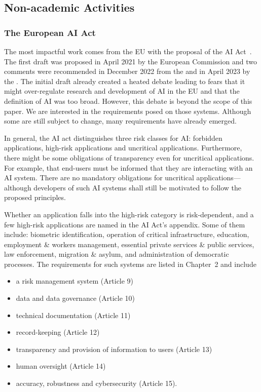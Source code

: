 \subsection{Non-academic Activities}
\subsubsection{The European \ac{AI} Act}
The most impactful work comes from the \ac{EU} with the proposal of the \ac{AI} Act~\citep{AiAct}. The first draft was proposed in April 2021 by the European Commission and two comments were recommended in December 2022 from the \cite{AiAct_Ratskompromiss} and in April 2023 by the \cite{AiAct_Parlamentsvorschlag}. 
The initial draft already created a heated debate leading to fears that it might over-regulate research and development of \ac{AI} in the \ac{EU} and that the definition of \ac{AI} was too broad. However, this debate is beyond the scope of this paper. We are interested in the requirements posed on those systems. Although some are still subject to change, many requirements have already emerged. 

In general, the \ac{AI} act distinguishes three risk classes for \ac{AI}: forbidden applications, high-risk applications and uncritical applications. Furthermore, there might be some obligations of transparency even for uncritical applications. For example, that end-users must be informed that they are interacting with an \ac{AI} system. There are no mandatory obligations for uncritical applications---although developers of such \ac{AI} systems shall still be motivated to follow the proposed principles. 

Whether an application falls into the high-risk category is risk-dependent, and a few high-risk applications are named in the \ac{AI} Act's appendix. Some of them include: biometric identification, operation of critical infrastructure, education, employment \& workers management, essential private services \& public services, law  enforcement, migration \& asylum, and administration of democratic processes. The requirements for such systems are listed in Chapter~2 and include 
\begin{itemize}
    \item a risk management system (Article 9)%
    \item  data and data governance (Article 10)%
    \item  technical documentation (Article 11)%
    \item record-keeping (Article 12)%
    \item  transparency and provision of information to users (Article 13)%
    \item  human oversight (Article 14)%
    \item  accuracy, robustness and cybersecurity (Article 15). 
\end{itemize}

